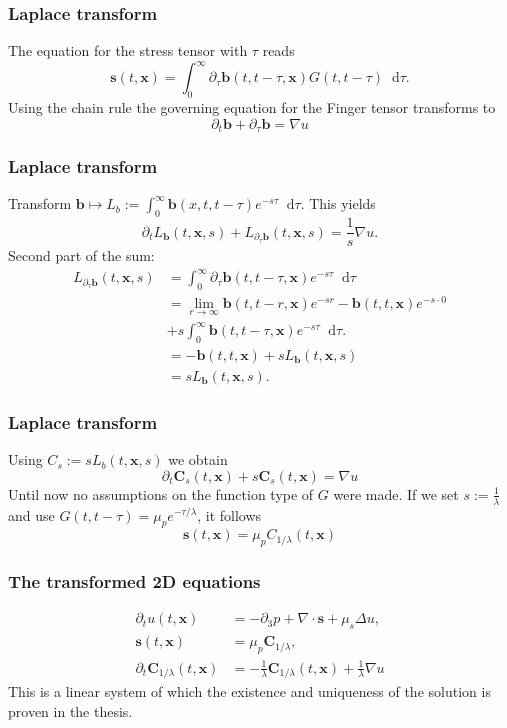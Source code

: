 \documentclass[12pt,a4paper,handout]{beamer}
\theoremstyle{definition}
\theoremstyle{plain}
\newcommand{\bfb}{\bm{b}}
\newcommand{\bfs}{\bm{s}}
\newcommand{\bfC}{\bm{C}}
\newcommand{\bfx}{\bm{x}}
\newcommand{\D}{\mathop{}\!\mathrm{d}}
\begin{document}
\begin{frame}
    \frametitle{Laplace transform}
    The equation for the stress tensor with $\tau$ reads
    \begin{equation*}
        \bfs(t,\bfx)=\int_0^\infty\partial_\tau\bfb(t,t-\tau,\bfx)G(t,t-\tau)\D\tau.
    \end{equation*}
   Using the chain rule the governing equation for the Finger tensor transforms to  
   \begin{equation*}
   \partial_t \bfb +\partial_\tau\bfb=\nabla u
   \end{equation*}
\end{frame}
\begin{frame}
    \frametitle{Laplace transform}
    Transform $\bfb\mapsto L_b:=\int_0^\infty \bfb(x,t,t-\tau)e^{-s\tau}\D \tau$. This yields
    \begin{equation*}
    \partial_tL_{\bfb}(t,\bfx,s) + L_{\partial_\tau\bfb}(t,\bfx,s) = \frac{1}{s}\nabla u.
    \end{equation*}
    Second part of the sum:
        \begin{align*}
        L_{\partial_\tau\bfb}(t,\bfx,s) &= \int_0^\infty\partial_\tau\bfb(t,t-\tau,\bfx)e^{-s\tau}\D\tau\\ &=\lim_{r\to\infty}\bfb(t,t-r,\bfx)e^{-sr}-\bfb(t,t,\bfx)e^{-s\cdot 0}\\&+s\int_0^\infty\bfb(t,t-\tau,\bfx)e^{-s\tau}\D\tau.\\
        &= -\bfb(t,t,\bfx) +sL_{\bfb}(t,\bfx, s)\\
        &= sL_{\bfb}(t,\bfx,s).
        \end{align*}
\end{frame}
\begin{frame}
    \frametitle{Laplace transform}
    Using $C_s:=sL_b(t,\bfx,s)$ we obtain
    \begin{equation*}
         \partial_t\bfC_s(t,\bfx)+s\bfC_s(t,\bfx)=\nabla u
    \end{equation*}
    Until now no assumptions on the function type of $G$ were made.
    If we set $s:=\frac{1}{\lambda}$ and use $G(t,t-\tau)=\mu_pe^{-\tau/\lambda}$, it follows
    \begin{equation*}
        \bfs(t,\bfx)=\mu_pC_{1/\lambda}(t,\bfx)
    \end{equation*}
\end{frame}
\begin{frame}
    \frametitle{The transformed 2D equations}
    \begin{align*}
        \partial_t u(t,\bfx) &= -\partial_3 p +\nabla\cdot \bfs+\mu_s\Delta u,\\
        \label{eq:transfeq2}
        \bfs(t,\bfx)&=\mu_p\bfC_{1/\lambda},\\
        \partial_t\bfC_{1/\lambda}(t,\bfx) &= -\frac{1}{\lambda}\bfC_{1/\lambda}(t,\bfx)+\frac{1}{\lambda}\nabla u    \end{align*}
        This is a linear system of which the existence and uniqueness of the solution is proven in the thesis.
\end{frame}
\end{document}
